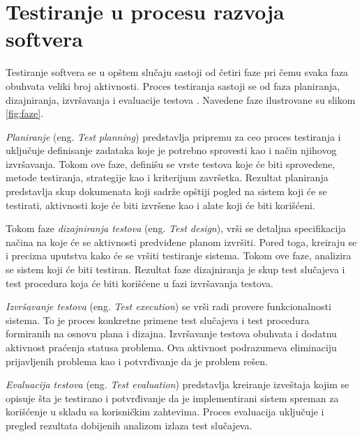 \documentclass[12pt,oneside]{memoir}
\begin{document}
\section{Testiranje u procesu razvoja softvera} \label{broj1}
\par 
Testiranje softvera se u opštem slučaju sastoji od četiri faze pri čemu svaka faza obuhvata veliki broj aktivnosti. Proces testiranja sastoji se od faza planiranja, dizajniranja, izvršavanja i evaluacije testova \cite{ImportanceOfTesting}. Navedene faze ilustrovane su slikom \ref{fig:faze}.
\par
\emph{Planiranje} (eng. \textit{Test planning}) predstavlja pripremu za ceo proces testiranja i uključuje definisanje zadataka koje je potrebno sprovesti kao i način njihovog izvršavanja. Tokom ove faze, definišu se vrste testova koje će biti sprovedene, metode testiranja, strategije kao i kriterijum završetka. Rezultat planiranja predstavlja skup dokumenata koji sadrže opštiji pogled na sistem koji će se testirati, aktivnosti koje će biti izvršene kao i alate koji će biti korišćeni.
\par 
Tokom faze \emph{dizajniranja testova} (eng. \textit{Test design}), vrši se detaljna specifikacija načina na koje će se aktivnosti predviđene planom izvršiti. Pored toga, kreiraju se i precizna uputstva kako će se vršiti testiranje sistema. Tokom ove faze, analizira se sistem koji će biti testiran. Rezultat faze dizajniranja je skup test slučajeva i test procedura koja će biti korišćene u fazi izvršavanja testova.
\par
\emph{Izvršavanje testova} (eng. \textit{Test execution}) se vrši radi provere funkcionalnosti sistema.
To je proces konkretne primene test slučajeva i test procedura formiranih na osnovu plana i dizajna. Izvršavanje testova obuhvata i dodatnu aktivnost praćenja statusa problema. Ova aktivnost podrazumeva eliminaciju prijavljenih problema kao i potvrđivanje da je problem rešen.
\par
\emph{Evaluacija testova} (eng. \textit{Test evaluation}) predstavlja kreiranje izveštaja kojim se opisuje šta je testirano i potvrđivanje da je implementirani sistem spreman za korišćenje u skladu sa korisničkim zahtevima. Proces evaluacija uključuje i pregled rezultata dobijenih analizom izlaza test slučajeva. \par
\end{document}
